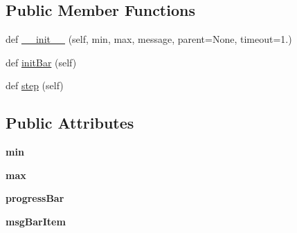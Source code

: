 \subsection*{Public Member Functions}
\begin{DoxyCompactItemize}
\item 
def \mbox{\hyperlink{class_dsg_tools_1_1_custom_widgets_1_1progress_widget_1_1_progress_widget_a3c1ac200ea1b4dd83cb1eb2afcc44f33}{\+\_\+\+\_\+init\+\_\+\+\_\+}} (self, min, max, message, parent=None, timeout=1.)
\item 
def \mbox{\hyperlink{class_dsg_tools_1_1_custom_widgets_1_1progress_widget_1_1_progress_widget_ada1c583d3db605102067606caeb75fb7}{init\+Bar}} (self)
\item 
def \mbox{\hyperlink{class_dsg_tools_1_1_custom_widgets_1_1progress_widget_1_1_progress_widget_aaa955ebf98d7504bd26d091930798cd6}{step}} (self)
\end{DoxyCompactItemize}
\subsection*{Public Attributes}
\begin{DoxyCompactItemize}
\item 
\mbox{\label{class_dsg_tools_1_1_custom_widgets_1_1progress_widget_1_1_progress_widget_a7eea84e45af67e703c44bc706cd827bd}} 
{\bfseries min}
\item 
\mbox{\label{class_dsg_tools_1_1_custom_widgets_1_1progress_widget_1_1_progress_widget_a7c00817f070cdb933ce1b8aa81748475}} 
{\bfseries max}
\item 
\mbox{\label{class_dsg_tools_1_1_custom_widgets_1_1progress_widget_1_1_progress_widget_a4f74fe215d6c44c00cd84439f00fe77b}} 
{\bfseries progress\+Bar}
\item 
\mbox{\label{class_dsg_tools_1_1_custom_widgets_1_1progress_widget_1_1_progress_widget_a95886717d67db67b2b36116e98d5a014}} 
{\bfseries msg\+Bar\+Item}
\end{DoxyCompactItemize}


